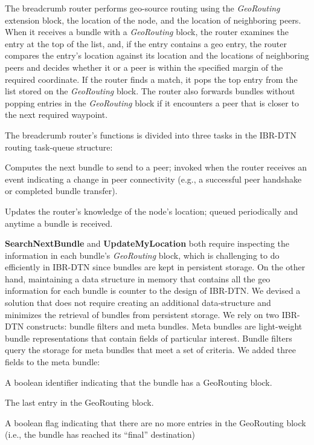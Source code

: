 
The {\sc breadcrumb} router performs geo-source routing using the {\em GeoRouting} extension block, the location of the node, and the location of neighboring peers. When it receives a bundle with a {\em GeoRouting} block, the router examines the entry at the top of the list, and, if the entry contains a geo entry, the router compares the entry's location against its location and the locations of neighboring peers and decides whether it or a peer is within the specified margin of the required coordinate. If the router finds a match, it pops the top entry from the list stored on the {\em GeoRouting} block. The router also forwards bundles without popping entries in the {\em GeoRouting} block if it encounters a peer that is closer to the next required waypoint. %

The {\sc breadcrumb} router's functions is divided into three tasks in the IBR-DTN routing task-queue structure:
\begin{description*}
\item[SearchNextBundle.] Computes the next bundle to send to a peer; invoked when the router receives an event indicating a change in peer connectivity (e.g., a successful peer handshake or completed bundle transfer).
\item[UpdateMyLocation.] Updates the router's knowledge of the node's location; queued periodically and anytime a bundle is received.
\end{description*}

{\bf SearchNextBundle} and {\bf UpdateMyLocation} both require inspecting the information in each bundle's {\em GeoRouting} block, which is challenging to do efficiently in IBR-DTN since bundles are kept in persistent storage. On the other hand, maintaining a data structure in memory that contains all the geo information for each bundle is counter to the design of IBR-DTN. We devised a solution that does not require creating an additional data-structure and minimizes the retrieval of bundles from persistent storage.  We rely on two IBR-DTN constructs: {\sc bundle filters} and {\sc meta bundles}. {\sc Meta bundles} are light-weight bundle representations that contain fields of particular interest. {\sc Bundle filters} query the storage for meta bundles that meet a set of criteria. We added three fields to the {\sc meta bundle}:
\begin{description*}
\item[hasgeoroute.] A boolean identifier indicating that the bundle has a {\sc GeoRouting} block.
\item[nextgeohop.] The last entry in the {\sc GeoRouting} block.
\item[reacheddest.] A boolean flag indicating that there are no more entries in the {\sc GeoRouting} block (i.e., the bundle has reached its ``final'' destination)
\end{description*}

